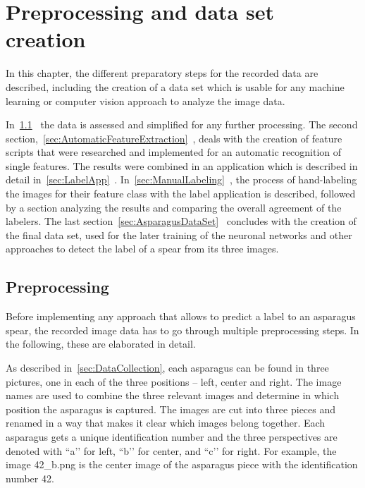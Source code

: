 \section{Preprocessing and data set creation}
\label{ch:Dataset}

In this chapter, the different preparatory steps for the recorded data are described, including the creation of a data set which is usable for any machine learning or computer vision approach to analyze the image data.

In~\ref{sec:Preprocessing}~ the data is assessed and simplified for any further processing. The second section,~\ref{sec:AutomaticFeatureExtraction}~, deals with the creation of feature scripts that were researched and implemented for an automatic recognition of single features.
The results were combined in an application which is described in detail in~\ref{sec:LabelApp}~. In~\ref{sec:ManualLabeling}~, the process of hand-labeling the images for their feature class with the label application is described, followed by a section analyzing the results and comparing the overall agreement of the labelers. The last section~\ref{sec:AsparagusDataSet}~ concludes with the creation of the final data set, used for the later training of the neuronal networks and other approaches to detect the label of a spear from its three images.


\subsection{Preprocessing}
\label{sec:Preprocessing}

Before implementing any approach that allows to predict a label to an asparagus spear, the recorded image data has to go through multiple preprocessing steps. In the following, these are elaborated in detail.

As described in~\autoref{sec:DataCollection}, each asparagus can be found in three pictures, one in each of the three positions – left, center and right. The image names are used to combine the three relevant images and determine in which position the asparagus is captured. The images are cut into three pieces and renamed in a way that makes it clear which images belong together. Each asparagus gets a unique identification number and the three perspectives are denoted with ``a’’ for left, ``b’’ for center, and ``c’’ for right. For example, the image 42\_b.png is the center image of the asparagus piece with the identification number 42. 

